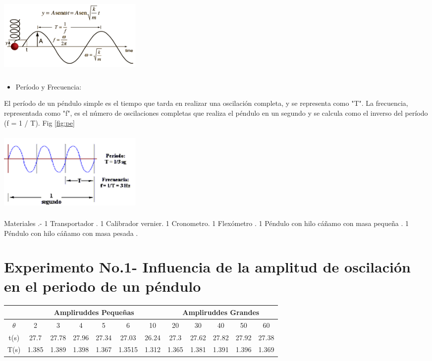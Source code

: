\documentclass[10pt]{article}
\begin{document}
\begin{multicols}{2}
\begin{center}
	\includegraphics[width=7cm, height=4cm]{Imagenes/mas.png}
	\label{fig:mas}
\end{center}

\begin{itemize}
	\item Período y Frecuencia:
\end{itemize}
El período de un péndulo simple es el tiempo que tarda en realizar una oscilación completa, y se representa como "T". La frecuencia, representada como "f", es el número de oscilaciones completas que realiza el péndulo en un segundo y se calcula como el inverso del período (f = 1 / T). Fig \ref{fig:pe}

\begin{center}
	\includegraphics[width=7cm, height=4cm]{Imagenes/periodo.png}
	\label{fig:pe}
\end{center}


Materiales .-
1 Transportador .
1 Calibrador vernier.
1 Cronometro.
1 Flexómetro .
1 Péndulo con hilo cáñamo con masa pequeña .
1 Péndulo con hilo cáñamo con masa pesada .

\section{Experimento No.1- Influencia de la amplitud de oscilación en el periodo de un péndulo}
 

\begin{center}
	\begin{adjustbox}{width=245pt}
		\begin{tabular}{|c|c|c|c|c|c|c|c|c|c|c|c|}
			\hline
			&\multicolumn{6}{|c|}{Ampliruddes Pequeñas} & \multicolumn{5}{|c|}{Ampliruddes Grandes}\\
			\hline
			$\theta$ & 2 & 3 & 4 & 5 & 6 & 10 & 20 & 30 & 40 & 50 & 60 \\
			\hline
			t(s) & 27.7&	27.78&	27.96&	27.34&	27.03	&26.24&	27.3	&27.62	&27.82&	27.92&	27.38 \\
			\hline
			T(s) &1.385&	1.389&	1.398	&1.367&	1.3515&	1.312&	1.365&	1.381	&1.391	&1.396	&1.369
			\\
			\hline
			

\end{tabular}
\end{adjustbox}
\end{center}
\end{multicols}
\end{document}
